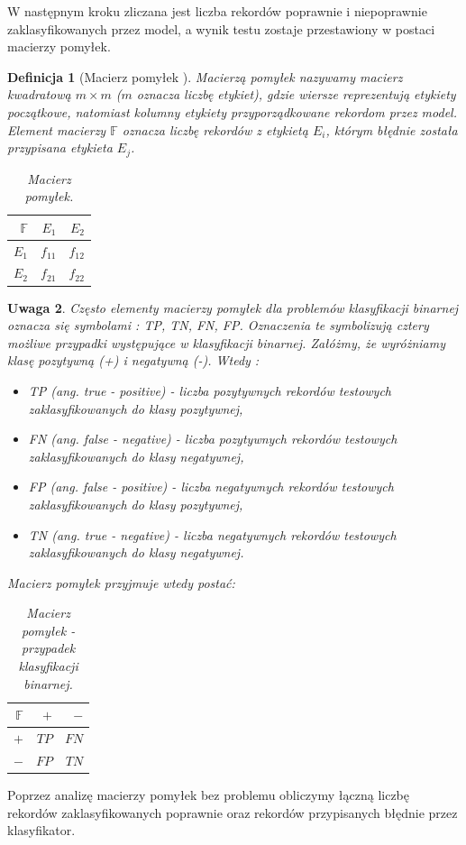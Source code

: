 \documentclass[12pt,a4paper]{report}
\newtheorem{df}{Definicja}[chapter]
\newtheorem{uwaga}[df]{Uwaga}
\begin{document}
W następnym kroku zliczana jest liczba rekordów poprawnie i niepoprawnie zaklasyfikowanych przez model, a wynik testu zostaje przestawiony w postaci macierzy pomyłek.
\begin{df}[Macierz pomyłek {\citep[Sec 4.8.1]{edmia}}]
Macierzą pomyłek nazywamy macierz kwadratową $ m \times m$ ($m$ oznacza liczbę etykiet), gdzie wiersze reprezentują etykiety początkowe, natomiast kolumny etykiety przyporządkowane rekordom przez model. Element macierzy $\mathbb{F}$ oznacza liczbę rekordów z etykietą $E_i$, którym błędnie została przypisana etykieta $E_j$.
\begin{table}[H]
\begin{center}
\begin{tabular}{|r|r|r|} \hline
$\mathbb{F}$ & $E_1$ & $E_2$\\
\hline 
$E_1$ & $f_{11}$ & $f_{12}$ \\
\hline
$E_2$ & $f_{21}$ & $f_{22}$  \\
\hline
\end{tabular}
\end{center}
\caption{Macierz pomyłek.}
\label{tabelka}
\end{table}
\end{df}
\begin{uwaga}{\citep[Sec 4.8.1]{edmia}}
Często elementy macierzy pomyłek dla problemów klasyfikacji binarnej oznacza się symbolami : TP, TN, FN, FP. Oznaczenia te symbolizują cztery możliwe przypadki występujące w klasyfikacji binarnej. Załóżmy, że wyróżniamy klasę pozytywną (+) i negatywną (-). Wtedy :
\begin{itemize}
\item TP (ang. true - positive) - liczba pozytywnych rekordów testowych zaklasyfikowanych do klasy pozytywnej,
\item FN (ang. false - negative) - liczba pozytywnych rekordów testowych zaklasyfikowanych do klasy negatywnej,
\item FP (ang. false - positive) - liczba negatywnych rekordów testowych zaklasyfikowanych do klasy pozytywnej,
\item TN (ang. true - negative) - liczba negatywnych rekordów testowych zaklasyfikowanych do klasy negatywnej.
\end{itemize}
Macierz pomyłek przyjmuje wtedy postać:
\begin{table}[H]
\begin{center}
\begin{tabular}{|r|r|r|} \hline
$\mathbb{F}$ & $+$ & $-$\\
\hline
$+$ & $TP$ & $FN$ \\
\hline
$-$ & $FP$ & $TN$  \\
\hline
\end{tabular}
\end{center}
\caption{Macierz pomyłek - przypadek klasyfikacji binarnej.}
\label{tabelka}
\end{table}
\end{uwaga}
Poprzez analizę macierzy pomyłek bez problemu obliczymy łączną liczbę rekordów zaklasyfikowanych poprawnie oraz rekordów przypisanych błędnie przez klasyfikator. 
\end{document}

